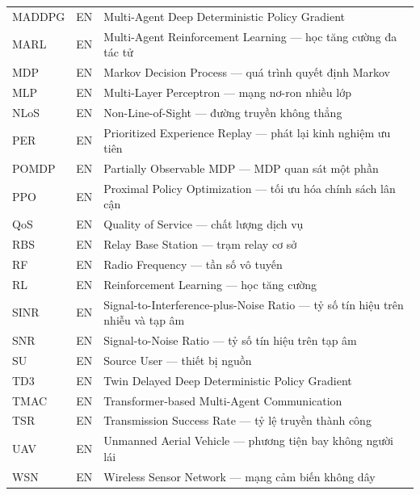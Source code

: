 \begin{longtable}{@{}p{3.8cm}p{1.5cm}p{9.2cm}@{}}
MADDPG    & EN & Multi-Agent Deep Deterministic Policy Gradient \\[3pt]
MARL      & EN & Multi-Agent Reinforcement Learning --- học tăng cường đa tác tử \\[3pt]
MDP       & EN & Markov Decision Process --- quá trình quyết định Markov \\[3pt]
MLP       & EN & Multi-Layer Perceptron --- mạng nơ-ron nhiều lớp \\[3pt]
NLoS      & EN & Non-Line-of-Sight --- đường truyền không thẳng \\[3pt]
PER       & EN & Prioritized Experience Replay --- phát lại kinh nghiệm ưu tiên \\[3pt]
POMDP     & EN & Partially Observable MDP --- MDP quan sát một phần \\[3pt]
PPO       & EN & Proximal Policy Optimization --- tối ưu hóa chính sách lân cận \\[3pt]
QoS       & EN & Quality of Service --- chất lượng dịch vụ \\[3pt]
RBS       & EN & Relay Base Station --- trạm relay cơ sở \\[3pt]
RF        & EN & Radio Frequency --- tần số vô tuyến \\[3pt]
RL        & EN & Reinforcement Learning --- học tăng cường \\[3pt]
SINR      & EN & Signal-to-Interference-plus-Noise Ratio --- tỷ số tín hiệu trên nhiễu và tạp âm \\[3pt]
SNR       & EN & Signal-to-Noise Ratio --- tỷ số tín hiệu trên tạp âm \\[3pt]
SU        & EN & Source User --- thiết bị nguồn \\[3pt]
TD3       & EN & Twin Delayed Deep Deterministic Policy Gradient \\[3pt]
TMAC      & EN & Transformer-based Multi-Agent Communication \\[3pt]
TSR       & EN & Transmission Success Rate --- tỷ lệ truyền thành công \\[3pt]
UAV       & EN & Unmanned Aerial Vehicle --- phương tiện bay không người lái \\[3pt]
WSN       & EN & Wireless Sensor Network --- mạng cảm biến không dây \\[3pt]

\end{longtable}
